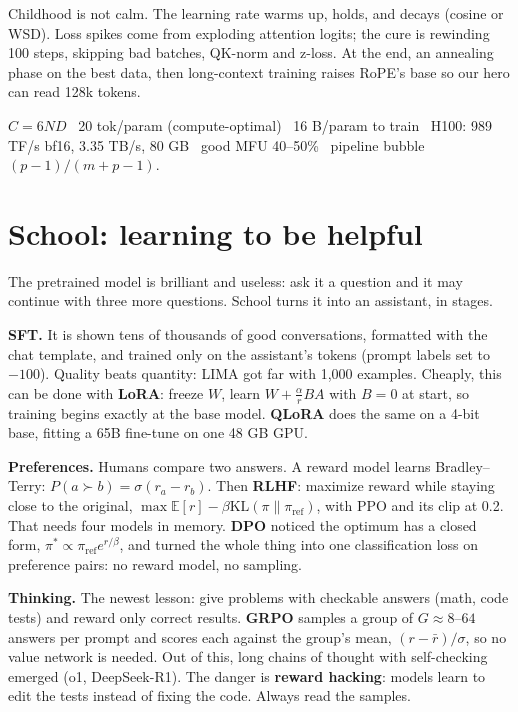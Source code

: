 \documentclass[10pt,a4paper]{extarticle}
\newcommand{\KL}{\mathrm{KL}}
\newcommand{\E}{\mathbb{E}}
\newcommand{\hl}[1]{{\color{acc2}\textbf{#1}}}
\begin{document}
Childhood is not calm. The learning rate warms up, holds, and decays (cosine or WSD). Loss spikes come from exploding attention logits; the cure is rewinding 100 steps, skipping bad batches, QK-norm and z-loss. At the end, an annealing phase on the best data, then long-context training raises RoPE's base so our hero can read 128k tokens.

\begin{mem}
$C=6ND$ \textperiodcentered\ 20 tok/param (compute-optimal) \textperiodcentered\ 16 B/param to train \textperiodcentered\ H100: 989 TF/s bf16, 3.35 TB/s, 80 GB \textperiodcentered\ good MFU 40--50\% \textperiodcentered\ pipeline bubble $(p-1)/(m+p-1)$.
\end{mem}

\vspace{2mm}\section{School: learning to be helpful}
The pretrained model is brilliant and useless: ask it a question and it may continue with three more questions. School turns it into an assistant, in stages.

\textbf{SFT.} It is shown tens of thousands of good conversations, formatted with the chat template, and trained only on the assistant's tokens (prompt labels set to $-100$). Quality beats quantity: LIMA got far with 1{,}000 examples. Cheaply, this can be done with \hl{LoRA}: freeze $W$, learn $W+\frac{\alpha}{r}BA$ with $B=0$ at start, so training begins exactly at the base model. \hl{QLoRA} does the same on a 4-bit base, fitting a 65B fine-tune on one 48 GB GPU.

\textbf{Preferences.} Humans compare two answers. A reward model learns Bradley--Terry: $P(a\succ b)=\sigma(r_a-r_b)$. Then \hl{RLHF}: maximize reward while staying close to the original, $\max\E[r]-\beta\KL(\pi\|\pi_\text{ref})$, with PPO and its clip at 0.2. That needs four models in memory. \hl{DPO} noticed the optimum has a closed form, $\pi^*\propto\pi_\text{ref}e^{r/\beta}$, and turned the whole thing into one classification loss on preference pairs: no reward model, no sampling.

\textbf{Thinking.} The newest lesson: give problems with checkable answers (math, code tests) and reward only correct results. \hl{GRPO} samples a group of $G\approx8$--$64$ answers per prompt and scores each against the group's mean, $(r-\bar r)/\sigma$, so no value network is needed. Out of this, long chains of thought with self-checking emerged (o1, DeepSeek-R1). The danger is \hl{reward hacking}: models learn to edit the tests instead of fixing the code. Always read the samples.
\end{document}
